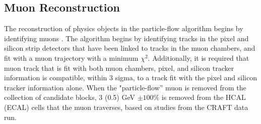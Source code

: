 \subsection{Muon Reconstruction}
\label{muon_reco_overview}

\par The reconstruction of physics objects in the particle-flow
algorithm begins by identifying muons \cite{CMS-PAS-PFT-09-001}.  The
algorithm begins by identifying tracks in the pixel and silicon strip
detectors that have been linked to tracks in the muon chambers, and
fit with a muon trajectory with a minimum $\chi^{2}$.  Additionally, it
is required that muon track that is fit with both muon chambers,
pixel, and silicon tracker information is compatible, within 3 sigma,
to a track fit with the pixel and silicon tracker information alone.
When the "particle-flow'' muon is removed from the collection of
candidate blocks, 3 (0.5) GeV $\pm 100\%$ is removed from the HCAL (ECAL)
cells that the muon traverses, based on studies from the CRAFT
data run.  

